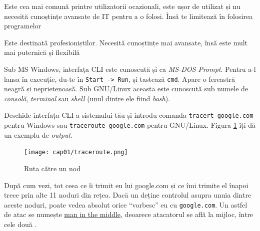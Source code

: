 \begin{itemize}
	\begin{item} 
	\end{item}
	
	\begin{item}
	\end{item}
\end{itemize}
Sub MS Windows, interfața CLI este cunoscută și ca \textsl{MS-DOS Prompt}. Pentru
a-l lansa în execuție, du-te în \texttt{Start -> Run}, și tastează \texttt{cmd}.
Apare o fereastră neagră și neprietenoasă. Sub GNU/Linux aceasta este
cunoscută sub numele de \textsl{consolă}, \textsl{terminal} sau
\textsl{shell} (unul dintre ele fiind \textsl{bash}).

Deschide interfața CLI a sistemului tău și introdu comanda
\texttt{tracert google.com} pentru Windows sau \texttt{traceroute google.com} pentru 
GNU/Linux. Figura \ref{fig:cli traceroute} îți dă un exemplu de \textsl{output}.

\begin{figure}[ht!]
  \centering
    \texttt{[image: cap01/traceroute.png]}
  \caption{Ruta către un nod}
  \label{fig:cli traceroute}
\end{figure}

După cum vezi, tot ceea ce îi trimit eu lui google.com și ce îmi trimite
el înapoi trece prin alte 11 noduri din rețea. Dacă un 
deține controlul asupra unuia dintre aceste noduri,
poate vedea absolut orice ``vorbesc'' eu cu \texttt{google.com}. Un astfel de atac
se numește \href{http://en.wikipedia.org/wiki/Man-in-the-middle_attack}{man in the middle},
deoarece atacatorul se află la mijloc, între
cele două .

